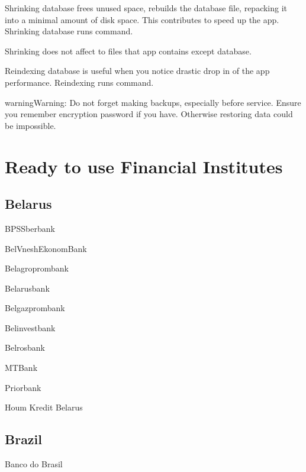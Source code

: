 \documentclass[a4paper,10pt,english]{sphinxmanual}
\begin{document}
\sphinxAtStartPar
Shrinking database frees unused space, rebuilds the database file, repacking it into a minimal
amount of disk space. This contributes to speed up the app. Shrinking database runs
 command.

\sphinxAtStartPar
Shrinking does not affect to files that app contains except database.

\sphinxAtStartPar
Reindexing database is useful when you notice drastic drop in of the app performance.
Reindexing runs  command.

\begin{sphinxadmonition}{warning}{Warning:}
\sphinxAtStartPar
Do not forget making backups, especially before service. Ensure you remember encryption password if you have. Otherwise restoring data could be impossible.
\end{sphinxadmonition}

\sphinxstepscope


\chapter{Ready to use Financial Institutes}
\label{\detokenize{banks:ready-to-use-financial-institutes}}\label{\detokenize{banks:chapter-supported-banks}}\label{\detokenize{banks::doc}}

\section{Belarus}
\label{\detokenize{banks:belarus}}
\sphinxAtStartPar
BPSSberbank

\sphinxAtStartPar
BelVneshEkonomBank

\sphinxAtStartPar
Belagroprombank

\sphinxAtStartPar
Belarusbank

\sphinxAtStartPar
Belgazprombank

\sphinxAtStartPar
Belinvestbank

\sphinxAtStartPar
Belrosbank

\sphinxAtStartPar
MTBank

\sphinxAtStartPar
Priorbank

\sphinxAtStartPar
Houm Kredit Belarus


\section{Brazil}
\label{\detokenize{banks:brazil}}
\sphinxAtStartPar
Banco do Brasil
\end{document}
